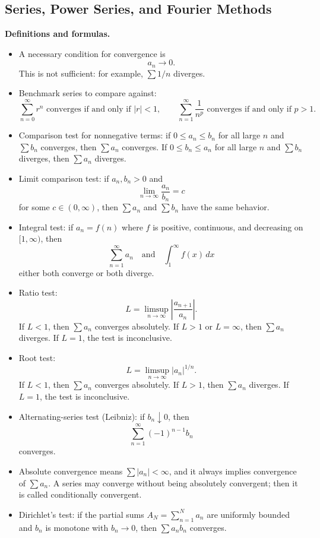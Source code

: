 \documentclass[11pt]{article}
\theoremstyle{definition}
\begin{document}
\subsection{Series, Power Series, and Fourier Methods}
\textbf{Definitions and formulas.}
\begin{itemize}
    \item A necessary condition for convergence is
    \[
        a_n\to 0.
    \]
    This is not sufficient: for example, $\sum 1/n$ diverges.
    \item Benchmark series to compare against:
    \[
        \sum_{n=0}^{\infty} r^n \text{ converges if and only if } |r|<1,
        \qquad
        \sum_{n=1}^{\infty}\frac{1}{n^p} \text{ converges if and only if } p>1.
    \]
    \item Comparison test for nonnegative terms: if $0\le a_n\le b_n$ for all large $n$ and $\sum b_n$ converges, then $\sum a_n$ converges. If $0\le b_n\le a_n$ for all large $n$ and $\sum b_n$ diverges, then $\sum a_n$ diverges.
    \item Limit comparison test: if $a_n,b_n>0$ and
    \[
        \lim_{n\to\infty}\frac{a_n}{b_n}=c
    \]
    for some $c\in(0,\infty)$, then $\sum a_n$ and $\sum b_n$ have the same behavior.
    \item Integral test: if $a_n=f(n)$ where $f$ is positive, continuous, and decreasing on $[1,\infty)$, then
    \[
        \sum_{n=1}^{\infty} a_n
        \quad \text{and} \quad
        \int_1^{\infty} f(x)\,dx
    \]
    either both converge or both diverge.
    \item Ratio test:
    \[
        L=\limsup_{n\to\infty}\left|\frac{a_{n+1}}{a_n}\right|.
    \]
    If $L<1$, then $\sum a_n$ converges absolutely. If $L>1$ or $L=\infty$, then $\sum a_n$ diverges. If $L=1$, the test is inconclusive.
    \item Root test:
    \[
        L=\limsup_{n\to\infty}|a_n|^{1/n}.
    \]
    If $L<1$, then $\sum a_n$ converges absolutely. If $L>1$, then $\sum a_n$ diverges. If $L=1$, the test is inconclusive.
    \item Alternating-series test (Leibniz): if $b_n\downarrow 0$, then
    \[
        \sum_{n=1}^{\infty}(-1)^{n-1}b_n
    \]
    converges.
    \item Absolute convergence means $\sum |a_n|<\infty$, and it always implies convergence of $\sum a_n$. A series may converge without being absolutely convergent; then it is called conditionally convergent.
    \item Dirichlet's test: if the partial sums $A_N=\sum_{n=1}^N a_n$ are uniformly bounded and $b_n$ is monotone with $b_n\to 0$, then $\sum a_n b_n$ converges.

\end{itemize}
\end{document}
